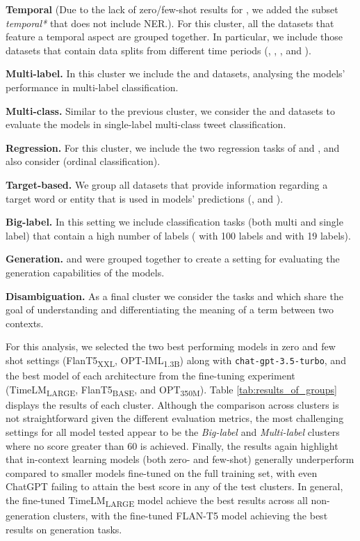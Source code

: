\textbf{Temporal} (Due to the lack of zero/few-shot results for {\TweetNER}, we added the subset \textit{temporal*} that does not include NER.). For this cluster, all the datasets  that feature a temporal aspect are grouped together. In particular, we include those datasets that contain data splits from different time periods ({\TweetNER}, {\TempoWiC}, {\TweetTopic}, and {\TweetNERD}).
  
\textbf{Multi-label.} In this cluster we include the {\TweetTopic} and {\TweetEmotion} datasets, analysing the models' performance in multi-label classification.

\textbf{Multi-class.} Similar to the previous cluster, we consider the {\TweetSentiment} and {\TweetHate} datasets to evaluate the models in single-label multi-class tweet classification.

\textbf{Regression.} For this cluster, we include the two regression tasks of {\TweetSimilarity} and {\TweetIntimacy}, and also consider {\TweetSentiment} (ordinal classification).

\textbf{Target-based.} We group all datasets that provide information regarding a target word or entity that is used in models' predictions ({\TweetSentiment}, {\TempoWiC} and {\TweetNERD}).

\textbf{Big-label.} In this setting we include classification tasks (both multi and single label) that contain a high number of labels ({\TweetEmoji} with 100 labels and {\TweetTopic} with 19 labels).

\textbf{Generation.} {\TweetQA} and {\TweetQG} were grouped together to create a setting for evaluating the generation capabilities of the models.

\textbf{Disambiguation.} As a final cluster we consider the tasks {\TempoWiC} and {\TweetNERD}  which share the goal of understanding and differentiating the meaning of a term between two contexts. 


For this analysis, we selected the two best performing models in zero and few shot settings (FlanT5\textsubscript{XXL}, OPT-IML\textsubscript{1.3B}) along with \texttt{chat-gpt-3.5-turbo}, and the best model of each architecture from the fine-tuning experiment (TimeLM\textsubscript{LARGE}, FlanT5\textsubscript{BASE}, and OPT\textsubscript{350M}). Table \ref{tab:results_of_groups} displays the results of each cluster. Although the comparison across clusters is not straightforward given the different evaluation metrics, the most challenging settings for all model tested appear to be the \textit{Big-label} and \textit{Multi-label} clusters where no score greater than 60 is achieved. Finally, the results again highlight that in-context learning models (both zero- and few-shot) generally underperform compared to smaller models fine-tuned on the full training set, with even ChatGPT failing to attain the best score in any of the test clusters. In general, the fine-tuned TimeLM\textsubscript{LARGE} model achieve the best results across all non-generation clusters, with the fine-tuned FLAN-T5 model achieving the best results on generation tasks.



